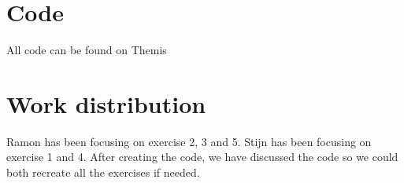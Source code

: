 \documentclass[twoside, a4paper, fleqn, reqno]{article}
\date{September 30, 2022}
\begin{document}
\maketitle

\section*{Code}
All code can be found on Themis

\section*{Work distribution}
Ramon has been focusing on exercise 2, 3 and 5. Stijn has been focusing on exercise 1 and 4.
After creating the code, we have discussed the code so we could both recreate all the exercises
if needed.
\end{document}
